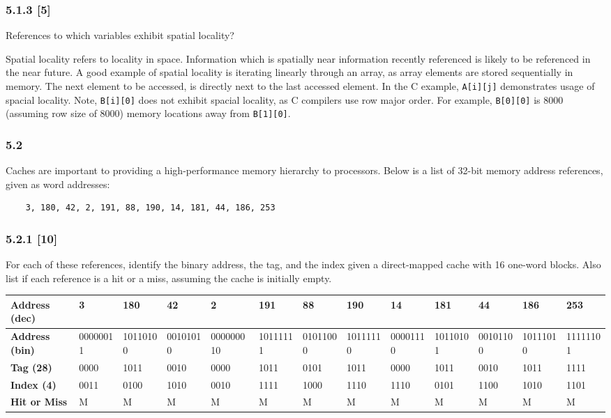 \documentclass[fleqn]{article}
\begin{document}
\subsubsection*{5.1.3 [5] \textrangle} References to which variables exhibit spatial locality?
\begin{addmargin}[0.15cm]{0cm}
    Spatial locality refers to locality in space. Information which is spatially near information recently referenced is likely to be referenced in the near future. 
    A good example of spatial locality is iterating linearly through an array, as array elements are stored sequentially in memory. The next element to be accessed, is directly next to the last accessed element. In the C example, \verb|A[i][j]| demonstrates usage of spacial locality. 
    Note, \verb|B[i][0]| does not exhibit spacial locality, as C compilers use row major order. For example, \verb|B[0][0]| is $8000$ (assuming row size of $8000$) memory locations away from \verb|B[1][0]|.
\end{addmargin}

\subsubsection*{5.2} Caches are important to providing a high-performance memory hierarchy to processors. Below is a list of 32-bit memory address references, given as word addresses:
\begin{verbatim}
    3, 180, 42, 2, 191, 88, 190, 14, 181, 44, 186, 253
\end{verbatim}

\subsubsection*{5.2.1 [10] \textrangle} For each of these references, identify the binary address, the tag, and the index given a direct-mapped cache with 16 one-word blocks. Also list if each reference is a hit or a miss, assuming the cache is initially empty.
\begin{table}[H]
    \centering
    \setlength{\tabcolsep}{3pt}
    \fontsize{6pt}{12pt}\selectfont
    \begin{tabular}{l|l|l|l|l|l|l|l|l|l|l|l|l}
    \textbf{Address (dec)} & \textbf{3} & \textbf{180} & \textbf{42} & \textbf{2} & \textbf{191} & \textbf{88} & \textbf{190} & \textbf{14} & \textbf{181} & \textbf{44} & \textbf{186} & \textbf{253} \\ \hline
    \textbf{Address (bin)} & 00000011 & 10110100 & 00101010 & 000000010 & 10111111 & 01011000 & 10111110 & 00001110 & 10110101 & 00101100 & 10111010 & 11111101 \\ 
    \textbf{Tag (28)} & 0000 & 1011 & 0010 & 0000 & 1011 & 0101 & 1011 & 0000 & 1011 & 0010 & 1011 & 1111 \\ 
    \textbf{Index (4)} & 0011 & 0100 & 1010 & 0010 & 1111 & 1000 & 1110 & 1110 & 0101 & 1100 & 1010 & 1101 \\ 
    \textbf{Hit or Miss} & M & M & M & M & M & M & M & M & M & M & M & M \\ 
    \end{tabular}
\end{table}
\end{document}
